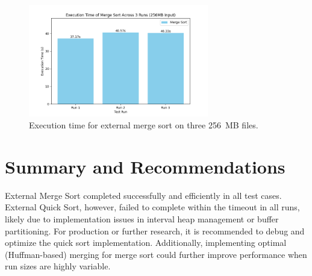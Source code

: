 \documentclass{article}
\begin{document}
\begin{figure}[h!]
\centering
\includegraphics[width=0.7\textwidth]{figures/merge_sort_time.png}
\caption{Execution time for external merge sort on three 256~MB files.}
\label{fig:merge_sort_time}
\end{figure}

\section*{Summary and Recommendations}
External Merge Sort completed successfully and efficiently in all test cases. External Quick Sort, however, failed to complete within the timeout in all runs, likely due to implementation issues in interval heap management or buffer partitioning. For production or further research, it is recommended to debug and optimize the quick sort implementation. Additionally, implementing optimal (Huffman-based) merging for merge sort could further improve performance when run sizes are highly variable.
\end{document}
